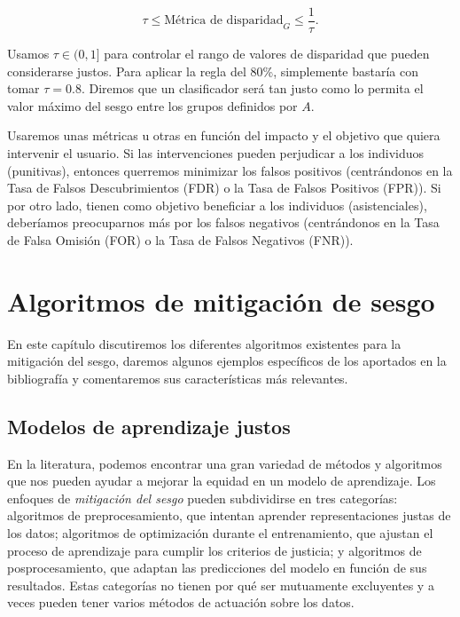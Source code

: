 \documentclass[oneside,openright,titlepage,numbers=noenddot,openany,headinclude,footinclude=true,
cleardoublepage=empty,abstractoff,BCOR=5mm,paper=a4,fontsize=12pt,main=spanish]{scrreprt}
\begin{document}
\begin{equation}
\tau \leq \text{Métrica de disparidad}_{G} \leq \frac{1}{\tau}.
\end{equation}

Usamos $\tau \in
(0,1]$ para controlar el rango de valores de disparidad que pueden considerarse justos. Para aplicar la regla del 80\%, simplemente bastaría con tomar $\tau=0.8$. Diremos que un clasificador será tan justo como lo permita el valor máximo del sesgo entre los grupos definidos por $A$. 

Usaremos unas métricas u otras en función del impacto y el objetivo que quiera intervenir el usuario. Si las intervenciones pueden perjudicar a los individuos (punitivas), entonces querremos minimizar los falsos positivos (centrándonos en la Tasa de Falsos Descubrimientos (FDR) o la Tasa de Falsos Positivos (FPR)). Si por otro lado, tienen como objetivo beneficiar a los individuos (asistenciales), deberíamos preocuparnos más por los falsos negativos (centrándonos en la Tasa de Falsa Omisión (FOR) o la Tasa de Falsos Negativos (FNR)).

\chapter{Algoritmos de mitigación de sesgo} \label{ch:algmitigar}

En este capítulo discutiremos los diferentes algoritmos existentes para la mitigación del sesgo, daremos algunos ejemplos específicos de los aportados en la bibliografía y comentaremos sus características más relevantes.

\section{Modelos de aprendizaje justos}

En la literatura, podemos encontrar una gran variedad de métodos y algoritmos que nos pueden ayudar a mejorar la equidad en un modelo de aprendizaje. Los enfoques de \textit{mitigación del sesgo} pueden subdividirse en tres categorías: algoritmos de preprocesamiento, que intentan aprender representaciones justas de los datos; algoritmos de optimización durante el entrenamiento, que ajustan el proceso de aprendizaje para cumplir los criterios de justicia; y algoritmos de posprocesamiento, que adaptan las predicciones del modelo en función de sus resultados. Estas categorías no tienen por qué ser mutuamente excluyentes y a veces pueden tener varios métodos de actuación sobre los datos.
\end{document}
